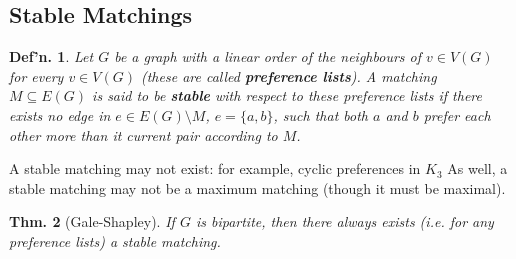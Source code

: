 \documentclass[12pt, a4paper]{book}
\newtheorem{theorem}{Thm.}[section]
\newtheorem{definition}[theorem]{Def'n.}
\theoremstyle{nonumberplain}
\begin{document}
\subsection{Stable Matchings}
\begin{definition}
    Let $G$ be a graph with a linear order of the neighbours of $v\in V(G)$ for every $v\in V(G)$ (these are called \textbf{preference lists}).
    A matching $M\subseteq E(G)$ is said to be \textbf{stable} with respect to these preference lists if there exists no edge in $e\in E(G)\setminus M$, $e=\{a,b\}$, such that both $a$ and $b$ prefer each other more than it current pair according to $M$.
\end{definition}
A stable matching may not exist: for example, cyclic preferences in $K_3$
As well, a stable matching may not be a maximum matching (though it must be maximal).
\begin{center}
\end{center}
\begin{theorem}[Gale-Shapley]
    If $G$ is bipartite, then there always exists (i.e. for any preference lists) a stable matching.
\end{theorem}
\end{document}
